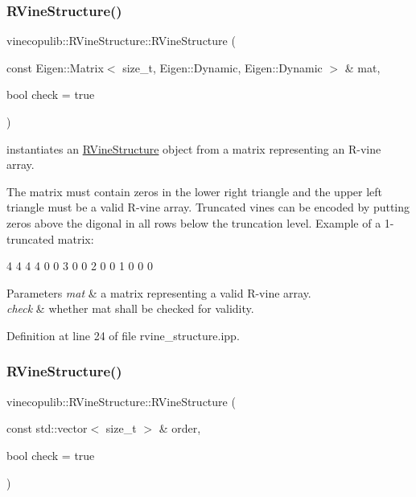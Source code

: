 \subsubsection{\texorpdfstring{R\+Vine\+Structure()}{RVineStructure()}\hspace{0.1cm}{\footnotesize\ttfamily [1/3]}}
{\footnotesize\ttfamily vinecopulib\+::\+R\+Vine\+Structure\+::\+R\+Vine\+Structure (\begin{DoxyParamCaption}\item[{const Eigen\+::\+Matrix$<$ size\+\_\+t, Eigen\+::\+Dynamic, Eigen\+::\+Dynamic $>$ \&}]{mat,  }\item[{bool}]{check = {\ttfamily true} }\end{DoxyParamCaption})\hspace{0.3cm}{\ttfamily [inline]}}



instantiates an \hyperlink{classvinecopulib_1_1_r_vine_structure}{R\+Vine\+Structure} object from a matrix representing an R-\/vine array. 

The matrix must contain zeros in the lower right triangle and the upper left triangle must be a valid R-\/vine array. Truncated vines can be encoded by putting zeros above the digonal in all rows below the truncation level. Example of a 1-\/truncated matrix\+: 
\begin{DoxyCode}
4 4 4 4
0 0 3 0
0 2 0 0
1 0 0 0
\end{DoxyCode}
 
\begin{DoxyParams}{Parameters}
{\em mat} & a matrix representing a valid R-\/vine array. \\
\hline
{\em check} & whether {\ttfamily mat} shall be checked for validity. \\
\hline
\end{DoxyParams}


Definition at line 24 of file rvine\+\_\+structure.\+ipp.

\mbox{\label{classvinecopulib_1_1_r_vine_structure_aa7e6b14379d8eed772e63c6944e3f610}} 
\subsubsection{\texorpdfstring{R\+Vine\+Structure()}{RVineStructure()}\hspace{0.1cm}{\footnotesize\ttfamily [2/3]}}
{\footnotesize\ttfamily vinecopulib\+::\+R\+Vine\+Structure\+::\+R\+Vine\+Structure (\begin{DoxyParamCaption}\item[{const std\+::vector$<$ size\+\_\+t $>$ \&}]{order,  }\item[{bool}]{check = {\ttfamily true} }\end{DoxyParamCaption})\hspace{0.3cm}{\ttfamily [inline]}}



